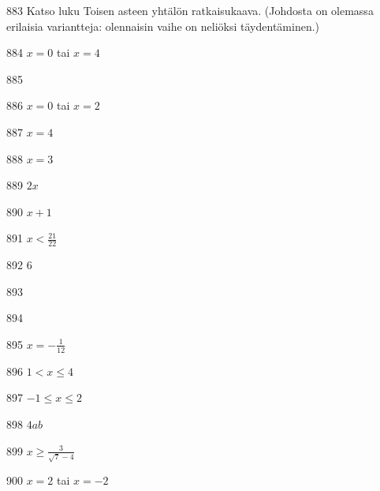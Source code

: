 \begin{Vastaus}{883}
	Katso luku Toisen asteen yhtälön ratkaisukaava. (Johdosta on olemassa erilaisia variantteja: olennaisin vaihe on neliöksi täydentäminen.)
	
\end{Vastaus}
\begin{Vastaus}{884}
$x=0$ tai $x=4$
\end{Vastaus}
\begin{Vastaus}{885}
\end{Vastaus}
\begin{Vastaus}{886}
$x=0$ tai $x=2$
\end{Vastaus}
\begin{Vastaus}{887}
$x = 4$
\end{Vastaus}
\begin{Vastaus}{888}
$x=3$
\end{Vastaus}
\begin{Vastaus}{889}
$2x$
\end{Vastaus}
\begin{Vastaus}{890}
$x+1$
\end{Vastaus}
\begin{Vastaus}{891}
$x<\frac{21}{22}$
\end{Vastaus}
\begin{Vastaus}{892}
$6$
\end{Vastaus}
\begin{Vastaus}{893}
\end{Vastaus}
\begin{Vastaus}{894}
	
\end{Vastaus}
\begin{Vastaus}{895}
$x=-\frac{1}{12}$
\end{Vastaus}
\begin{Vastaus}{896}
$1<x \leq 4$
\end{Vastaus}
\begin{Vastaus}{897}
$-1 \leq x \leq 2$
\end{Vastaus}
\begin{Vastaus}{898}
$4ab$
\end{Vastaus}
\begin{Vastaus}{899}
$x \geq \frac{3}{\sqrt{7}-4}$
\end{Vastaus}
\begin{Vastaus}{900}
$x=2$ tai $x=-2$
\end{Vastaus}
